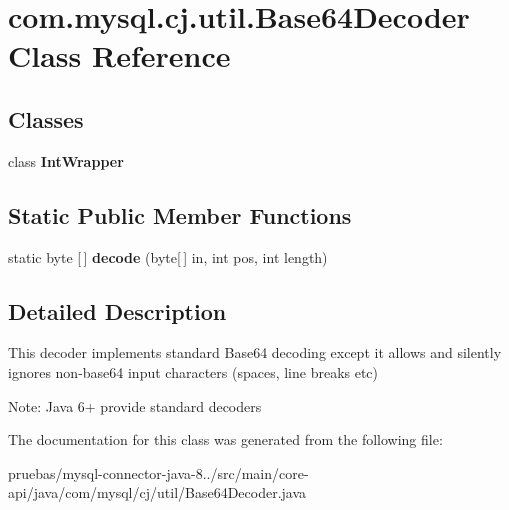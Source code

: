 \hypertarget{classcom_1_1mysql_1_1cj_1_1util_1_1_base64_decoder}{}\section{com.\+mysql.\+cj.\+util.\+Base64\+Decoder Class Reference}
\label{classcom_1_1mysql_1_1cj_1_1util_1_1_base64_decoder}
\subsection*{Classes}
\begin{DoxyCompactItemize}
\item 
class {\bfseries Int\+Wrapper}
\end{DoxyCompactItemize}
\subsection*{Static Public Member Functions}
\begin{DoxyCompactItemize}
\item 
\mbox{\label{classcom_1_1mysql_1_1cj_1_1util_1_1_base64_decoder_aafbcacd62566530b7319f2b2dce34b8c}} 
static byte \mbox{[}$\,$\mbox{]} {\bfseries decode} (byte\mbox{[}$\,$\mbox{]} in, int pos, int length)
\end{DoxyCompactItemize}


\subsection{Detailed Description}
This decoder implements standard Base64 decoding except it allows and silently ignores non-\/base64 input characters (spaces, line breaks etc)

Note\+: Java 6+ provide standard decoders 

The documentation for this class was generated from the following file\+:\begin{DoxyCompactItemize}
\item 
pruebas/mysql-\/connector-\/java-\/8../src/main/core-\/api/java/com/mysql/cj/util/Base64\+Decoder.\+java\end{DoxyCompactItemize}
